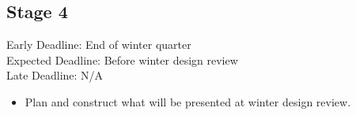 \documentclass{article}
\begin{document}
\subsection{Stage 4}
Early Deadline: End of winter quarter \\
Expected Deadline: Before winter design review \\
Late Deadline: N/A \\
\begin{itemize}
\item Plan and construct what will be presented at winter design review.
\end{itemize}
\end{document}
